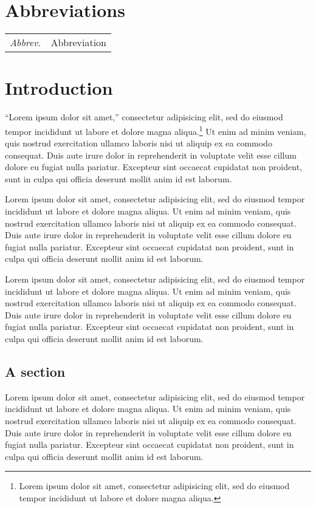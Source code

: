 \documentclass[12pt,letterpaper,oneside,final]{memoir}
\begin{document}
\chapter{Abbreviations}
\SingleSpacing
\begin{longtable}{ll}
\emph{Abbrev.} & Abbreviation\\
\end{longtable}

\DoubleSpacing
\mainmatter
\clearpage
\cleardoublepage  
{}  
{}

\chapter*[Introduction]{Introduction}
\label{ch-intro}
\enquote{Lorem ipsum dolor sit amet,} consectetur adipisicing elit, sed do eiusmod tempor incididunt ut labore et dolore magna aliqua.\footnote{Lorem ipsum dolor sit amet, consectetur adipisicing elit, sed do eiusmod tempor incididunt ut labore et dolore magna aliqua.} Ut enim ad minim veniam, quis nostrud exercitation ullamco laboris nisi ut aliquip ex ea commodo consequat. Duis aute irure dolor in reprehenderit in voluptate velit esse cillum dolore eu fugiat nulla pariatur. Excepteur sint occaecat cupidatat non proident, sunt in culpa qui officia deserunt mollit anim id est laborum.

Lorem ipsum dolor sit amet, consectetur adipisicing elit, sed do eiusmod tempor incididunt ut labore et dolore magna aliqua. Ut enim ad minim veniam, quis nostrud exercitation ullamco laboris nisi ut aliquip ex ea commodo consequat. Duis aute irure dolor in reprehenderit in voluptate velit esse cillum dolore eu fugiat nulla pariatur. Excepteur sint occaecat cupidatat non proident, sunt in culpa qui officia deserunt mollit anim id est laborum.

Lorem ipsum dolor sit amet, consectetur adipisicing elit, sed do eiusmod tempor incididunt ut labore et dolore magna aliqua. Ut enim ad minim veniam, quis nostrud exercitation ullamco laboris nisi ut aliquip ex ea commodo consequat. Duis aute irure dolor in reprehenderit in voluptate velit esse cillum dolore eu fugiat nulla pariatur. Excepteur sint occaecat cupidatat non proident, sunt in culpa qui officia deserunt mollit anim id est laborum.

\section{A section}
Lorem ipsum dolor sit amet, consectetur adipisicing elit, sed do eiusmod tempor incididunt ut labore et dolore magna aliqua. Ut enim ad minim veniam, quis nostrud exercitation ullamco laboris nisi ut aliquip ex ea commodo consequat. Duis aute irure dolor in reprehenderit in voluptate velit esse cillum dolore eu fugiat nulla pariatur. Excepteur sint occaecat cupidatat non proident, sunt in culpa qui officia deserunt mollit anim id est laborum.
\end{document}
